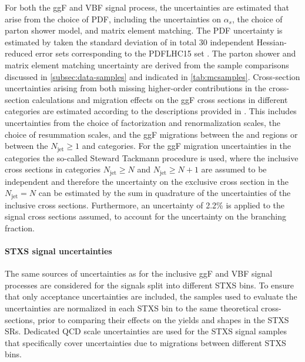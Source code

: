 For both the ggF and VBF signal process, the uncertainties are estimated that arise from the choice of PDF, including the uncertainties on $\alpha_s$, the choice of parton shower model, and matrix element matching.
The PDF uncertainty is estimated by taken the standard deviation of in total 30 independent Hessian-reduced error sets corresponding to the PDFLHC15 set \cite{Butterworth:2015oua}. 
The parton shower and matrix element matching uncertainty are derived from the sample comparisons discussed in \cref{subsec:data-samples} and indicated in \cref{tab:mcsamples}.
Cross-section uncertainties arising from both missing higher-order contributions in the cross-section calculations and migration effects on the ggF cross sections in different \Njets categories are estimated according to the descriptions provided in .
This includes uncertainties from the choice of factorization and renormalization scales, the choice of resummation scales, and the ggF migrations between the \ZeroJet and \OneJet regions or between the $N_{\text{jet}} \ge 1$  and \TwoJet categories.
For the ggF migration uncertainties in the \TwoJet categories the so-called Steward Tackmann procedure is used, where the inclusive cross sections in categories $N_{\text{jet}} \ge N$ and $N_{\text{jet}} \ge N+1$ are assumed to be independent and therefore the uncertainty on the exclusive cross section in the $N_{\text{jet}} = N$ can be estimated by the sum in quadrature of the uncertainties of the inclusive cross sections.
Furthermore, an uncertainty of 2.2\% is applied to the signal cross sections assumed, to account for the uncertainty on the \HWW branching fraction. 

\paragraph{STXS signal uncertainties}
The same sources of uncertainties as for the inclusive ggF and VBF signal processes are considered for the signals split into different STXS bins. 
To ensure that only acceptance uncertainties are included, the samples used to evaluate the uncertainties are normalized in each STXS bin to the same theoretical cross-sections, prior to comparing their effects on the yields and shapes in the STXS SRs. 
Dedicated QCD scale uncertainties are used for the STXS signal samples that specifically cover uncertainties due to migrations between different STXS bins. 

